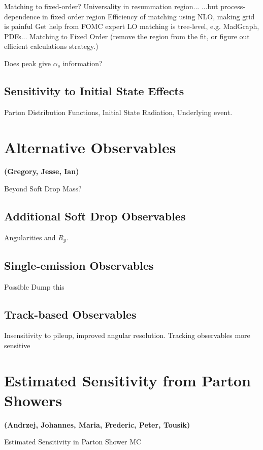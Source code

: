 \documentclass[11pt,letterpaper]{article}
\newcommand{\info}[1]{\textbf{\textcolor{mildred}{(#1)}}}
\begin{document}
	Matching to fixed-order?
		Universality in resummation region...
		...but process-dependence in fixed order region
		Efficiency of matching using NLO, making grid is painful
		Get help from FOMC expert
		LO matching is tree-level, e.g. MadGraph, PDFs...
		Matching to Fixed Order (remove the region from the fit, or figure out efficient calculations strategy.)

	Does peak give $\alpha_s$ information?
	
\subsection{Sensitivity to Initial State Effects }

	Parton Distribution Functions, 	Initial State Radiation, Underlying event.

\section{Alternative Observables}

\info{Gregory, Jesse, Ian}

Beyond Soft Drop Mass?

\subsection{Additional Soft Drop Observables}

Angularities and $R_g$.

\subsection{Single-emission Observables}

Possible Dump this

\subsection{Track-based Observables}

Insensitivity to pileup, improved angular resolution.
	Tracking observables more sensitive


\section{Estimated Sensitivity from Parton Showers}
\info{Andrzej, Johannes, Maria, Frederic, Peter, Tousik}


Estimated Sensitivity in Parton Shower MC
\end{document}
